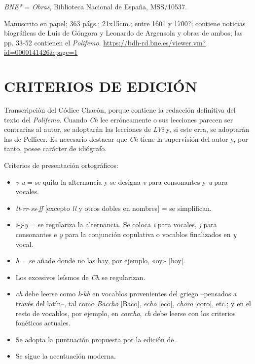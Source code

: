 \documentclass[11pt,a4paper,twoside]{article}
\begin{document}
\textit{BNE*} = \textit{Obras}, Biblioteca Nacional de España, MSS/10537. 

Manuscrito en papel; 363 págs.; 21x15cm.; entre 1601 y 1700?; contiene noticias biográficas de Luis de Góngora y Leonardo de Argensola y obras de ambos; las pp. 33-52 contienen el \textit{Polifemo}. \url{https://bdh-rd.bne.es/viewer.vm?id=0000141426&page=1}

\section*{\fontsize{13}{14.35}\selectfont CRITERIOS DE EDICIÓN}

Transcripción del Códice Chacón, porque contiene la redacción definitiva del texto del \textit{Polifemo}. Cuando \textit{Ch} lee erróneamente o sus lecciones parecen ser contrarias al autor, se adoptarán las lecciones de \textit{LVi} y, si este erra, se adoptarán las de Pellicer. Es necesario destacar que \textit{Ch} tiene la supervisión del autor y, por tanto, posee carácter de idiógrafo. 

Criterios de presentación ortográficos: 

\begin{itemize}[label=--]%
\item \textit{v}-\textit{u} = se quita la alternancia y se designa \textit{v} para consonantes y \textit{u} para vocales.
\item \textit{tt}-\textit{rr}-\textit{ss}-\textit{ff} [excepto \textit{ll} y otros dobles en nombres] = se simplifican.
\item \textit{i}-\textit{j}-\textit{y} = se regulariza la alternancia. Se coloca \textit{i} para vocales, \textit{j }para consonantes e \textit{y} para la conjunción copulativa o vocablos finalizados en \textit{y} vocal.
\item \textit{h} = se añade donde no las hay, por ejemplo, «oy» [hoy].
\item Los excesivos leísmos de \textit{Ch} se regularizan.
\item \textit{ch} debe leerse como \textit{k}-\textit{kh} en vocablos provenientes del griego --pensados a través del latín--, tal como \textit{Baccho} [Baco], \textit{echo} [eco], \textit{choro} [coro], etc.; y en el resto de vocablos, por ejemplo, en \textit{corcho}, \textit{ch} debe leerse con los criterios fonéticos actuales.
\item Se adopta la puntuación propuesta por la edición de \textcite{Alonso1967}.
\item Se sigue la acentuación moderna.%
\end{itemize}
\end{document}
